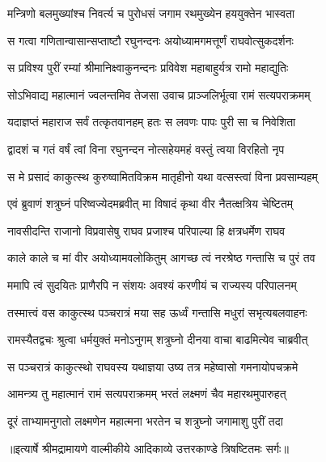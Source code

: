 \twolineshloka
{मन्त्रिणो बलमुख्यांश्च निवर्त्य च पुरोधसं}
{जगाम रथमुख्येन हययुक्तेन भास्वता} %

\twolineshloka
{स गत्वा गणितान्वासान्सप्ताष्टौ रघुनन्दनः}
{अयोध्यामगमत्तूर्णं राघवोत्सुकदर्शनः} %

\twolineshloka
{स प्रविश्य पुरीं रम्यां श्रीमानिक्ष्वाकुनन्दनः}
{प्रविवेश महाबाहुर्यत्र रामो महाद्युतिः} %

\twolineshloka
{सोऽभिवाद्य महात्मानं ज्वलन्तमिव तेजसा}
{उवाच प्राञ्जलिर्भूत्वा रामं सत्यपराक्रमम्} %

\twolineshloka
{यदाज्ञप्तं महाराज सर्वं तत्कृतवानहम्}
{हतः स लवणः पापः पुरी सा च निवेशिता} %

\twolineshloka
{द्वादशं च गतं वर्षं त्वां विना रघुनन्दन}
{नोत्सहेयमहं वस्तुं त्वया विरहितो नृप} %

\twolineshloka
{स मे प्रसादं काकुत्स्थ कुरुष्वामितविक्रम}
{मातृहीनो यथा वत्सस्त्वां विना प्रवसाम्यहम्} %

\twolineshloka
{एवं ब्रुवाणं शत्रुघ्नं परिष्वज्येदमब्रवीत्}
{मा विषादं कृथा वीर नैतत्क्षत्रिय चेष्टितम्} %

\twolineshloka
{नावसीदन्ति राजानो विप्रवासेषु राघव}
{प्रजाश्च परिपाल्या हि क्षत्रधर्मेण राघव} %

\twolineshloka
{काले काले च मां वीर अयोध्यामवलोकितुम्}
{आगच्छ त्वं नरश्रेष्ठ गन्तासि च पुरं तव} %

\twolineshloka
{ममापि त्वं सुदयितः प्राणैरपि न संशयः}
{अवश्यं करणीयं च राज्यस्य परिपालनम्} %

\twolineshloka
{तस्मात्त्वं वस काकुत्स्थ पञ्चरात्रं मया सह}
{ऊर्ध्वं गन्तासि मधुरां सभृत्यबलवाहनः} %

\twolineshloka
{रामस्यैतद्वचः श्रुत्वा धर्मयुक्तं मनोऽनुगम्}
{शत्रुघ्नो दीनया वाचा बाढमित्येव चाब्रवीत्} %

\twolineshloka
{स पञ्चरात्रं काकुत्स्थो राघवस्य यथाज्ञया}
{उष्य तत्र महेष्वासो गमनायोपचक्रमे} %

\twolineshloka
{आमन्त्र्य तु महात्मानं रामं सत्यपराक्रमम्}
{भरतं लक्ष्मणं चैव महारथमुपारुहत्} %

\twolineshloka
{दूरं ताभ्यामनुगतो लक्ष्मणेन महात्मना}
{भरतेन च शत्रुघ्नो जगामाशु पुरीं तदा} %


{॥इत्यार्षे श्रीमद्रामायणे वाल्मीकीये आदिकाव्ये उत्तरकाण्डे त्रिषष्टितमः सर्गः॥}


